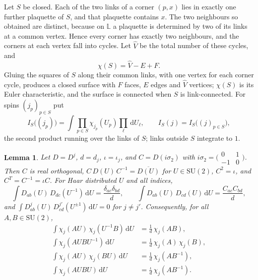 \documentclass[11pt,a4paper]{amsart}
\newtheorem{lemma}[theorem]{Lemma}
\theoremstyle{definition}
\theoremstyle{remark}
\numberwithin{equation}{section}
\newcommand{\dd}{\,\mathrm{d}}             %
\newcommand{\SU}{\mathrm{SU}}              %
\begin{document}
Let $S$ be closed. Each of the two links of a corner $(p,x)$ lies in exactly one further plaquette of $S$, and that plaquette contains $x$. The two neighbours so obtained are distinct, because on $\mathbb{L}$ a plaquette is determined by two of its links at a common vertex. Hence every corner has exactly two neighbours, and the corners at each vertex fall into cycles. Let $\hat V$ be the total number of these cycles, and
\[
\chi(S)=\hat V-E+F.
\]
Gluing the squares of $S$ along their common links, with one vertex for each corner cycle, produces a closed surface with $F$ faces, $E$ edges and $\hat V$ vertices; $\chi(S)$ is its Euler characteristic, and the surface is connected when $S$ is link-connected. For spins $(j_p)_{p\in S}$ put
\begin{equation}\label{eq:surface-integral}
I_S\bigl((j_p)\bigr)=\int\prod_{p\in S}\chi_{j_p}(U_p)\prod_{\ell}\dd U_\ell,\qquad I_S(j)=I_S\bigl((j)_{p\in S}\bigr),
\end{equation}
the second product running over the links of $S$; links outside $S$ integrate to $1$.

\begin{lemma}\label{lem:pairing}
Let $D=D^j$, $d=d_j$, $\iota=\iota_j$, and $C=D(i\sigma_2)$ with $i\sigma_2=\bigl(\begin{smallmatrix}0&1\\-1&0\end{smallmatrix}\bigr)$. Then $C$ is real orthogonal, $C\,D(U)\,C^{-1}=\overline{D(U)}$ for $U\in\SU(2)$, $C^2=\iota$, and $C^T=C^{-1}=\iota C$. For Haar distributed $U$ and all indices,
\begin{equation}\label{eq:pairing}
\int D_{ab}(U)\,D_{dc}(U^{-1})\dd U=\frac{\delta_{ac}\delta_{bd}}{d},\qquad
\int D_{ab}(U)\,D_{cd}(U)\dd U=\frac{C_{ac}C_{bd}}{d},
\end{equation}
and $\int D^{j}_{ab}(U)\,D^{j'}_{cd}(U^{\pm1})\dd U=0$ for $j\ne j'$. Consequently, for all $A,B\in\SU(2)$,
\begin{align}
\int\chi_j(AU)\,\chi_j(U^{-1}B)\dd U&=\tfrac1d\,\chi_j(AB),\tag{R1}\\
\int\chi_j(AUBU^{-1})\dd U&=\tfrac1d\,\chi_j(A)\,\chi_j(B),\tag{R2}\\
\int\chi_j(AU)\,\chi_j(BU)\dd U&=\tfrac1d\,\chi_j(AB^{-1}),\tag{R3}\\
\int\chi_j(AUBU)\dd U&=\tfrac{\iota}{d}\,\chi_j(AB^{-1}).\tag{R4}
\end{align}
\end{lemma}
\end{document}

